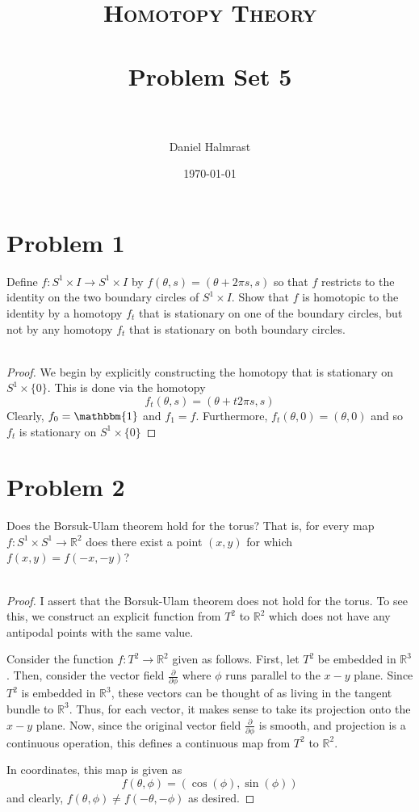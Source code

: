 \documentclass[fontsize=11pt]{scrartcl} %
\title{	
\normalfont \normalsize 
\textsc{Homotopy Theory} \\ [25pt] %
\horrule{0.5pt} \\[0.4cm] %
\huge Problem Set 5 \\ %
\horrule{2pt} \\[0.5cm] %
}
\author{Daniel Halmrast} %
\date{\normalsize\today} %
\numberwithin{equation}{section} %
\numberwithin{figure}{section} %
\numberwithin{table}{section} %
\newcommand{\R}{\mathbb{R}}
\begin{document}
\maketitle %

\section*{Problem 1}
Define $f:S^1\times I\to S^1\times I$ by $f(\theta,s) = (\theta+2\pi s,s)$ so
that $f$ restricts to the identity on the two boundary circles of $S^1\times I$. 
Show that $f$ is homotopic to the identity by a homotopy $f_t$ that is
stationary on one of the boundary circles, but not by any homotopy $f_t$ that
is stationary on both boundary circles.
\\
\\
\begin{proof}
    We begin by explicitly constructing the homotopy that is stationary on
    $S^1\times\{0\}$. This is done via the homotopy
    \[
        f_t(\theta,s) = (\theta + t2\pi s,s)
    \]
    Clearly, $f_0 = \mathbbm{1}$ and $f_1 = f$. Furthermore, $f_t(\theta,0) =
    (\theta,0)$ and so $f_t$ is stationary on $S^1\times \{0\}$

\end{proof}


\section*{Problem 2}
Does the Borsuk-Ulam theorem hold for the torus? That is, for every map
$f:S^1\times S^1 \to \R^2$ does there exist a point $(x,y)$ for which
$f(x,y) = f(-x,-y)$?
\\
\\
\begin{proof}
    I assert that the Borsuk-Ulam theorem does not hold for the torus. To see
    this, we construct an explicit function from $T^2$ to $\R^2$ which does not
    have any antipodal points with the same value.

    Consider the function $f:T^2\to \R^2$ given as follows. First, let $T^2$ be
    embedded in $\R^3$. Then, consider the vector field
    $\frac{\partial}{\partial\phi}$ where $\phi$ runs parallel to the $x-y$
    plane. Since $T^2$ is embedded in $\R^3$, these vectors can be thought of as
    living in the tangent bundle to $\R^3$. Thus, for each vector, it makes
    sense to take its projection onto the $x-y$ plane. Now, since the original
    vector field $\frac{\partial}{\partial \phi}$ is smooth, and projection is a
    continuous operation, this defines a continuous map from $T^2$ to $\R^2$.

    In coordinates, this map is given as
    \begin{equation}
        f(\theta,\phi) = (\cos(\phi),\sin(\phi))
    \end{equation}
    and clearly, $f(\theta,\phi)\neq f(-\theta,-\phi)$ as desired.
\end{proof}
\end{document}
